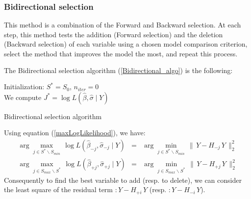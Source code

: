 \subsubsection{Bidirectional selection}

This method is a combination of the Forward and Backward selection. At each step, this method tests
the addition (Forward selection) and the deletion (Backward selection) of each variable using a chosen model comparison criterion,
select the method that improves the model the most, and repeat this process.

The Bidirectional selection algorithm (\ref{Bidirectional_algo}) is the following:
\begin{algorithm}
\label{Bidirectional_algo}
Initialization: $S^* = S_0$, $n_{iter} = 0 $\\
We compute $J^* = \log L(\hat{\beta},\hat{\sigma}\mid Y)$  \\
\caption{Bidirectional selection algorithm }
\end{algorithm}

Using equation (\ref{maxLogLikelihood}), we have:
 \begin{eqnarray}
 \arg   \displaystyle\max_{j \in S^*\backslash S_{min}}\,  \log L(\hat{\beta}_{-j},\hat{\sigma}_{-j}\mid Y) &=&
\arg \displaystyle\min_{j \in S^*\backslash S_{min}}\, \|\,Y-H_{-j}\,Y\,\|^2_2  \\
\arg   \displaystyle\max_{j \in S_{max} \backslash S^*}\,  \log L(\hat{\beta}_{+j},\hat{\sigma}_{+j}\mid Y)  &=&
\arg \displaystyle\min_{j \in S_{max} \backslash S^*}\, \|\,Y-H_{+j}\,Y\,\|^2_2
 \end{eqnarray}
 Consequently to find the best variable to add (resp. to delete), we can consider the least square of the residual term $:Y-H_{+i}\,Y$
 (resp.  $:Y-H_{-i}\,Y$).


